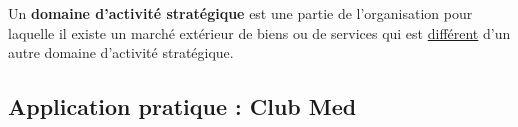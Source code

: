 	Un \textbf{domaine d'activité stratégique} est une partie de l'organisation pour laquelle il existe un marché extérieur de biens ou de services qui est \underline{différent} d'un autre domaine d'activité stratégique.

\subsection{Application pratique : Club Med}

